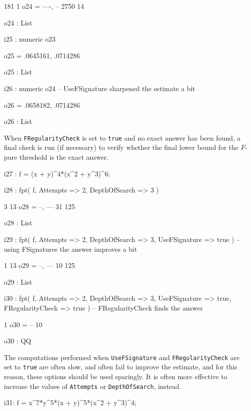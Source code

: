 \documentclass{amsart}
\begin{document}
{{\begin{MyVerbatim}
        181   1
o24 = {----, --}
       2750  14

o24 : List

i25 : numeric o23

o25 = {.0645161, .0714286}

o25 : List

i26 : numeric o24 -- UseFSignature sharpened the estimate a bit

o26 = {.0658182, .0714286}

o26 : List

\end{MyVerbatim}
}

When {\tt FRegularityCheck} is set to {\tt true} and no exact answer has been found, a final check is run (if necessary) to verify whether the final lower bound for the $F$-pure threshold is the exact answer.

{\small
{}
\begin{MyVerbatim}

i27 : f = (x + y)^4*(x^2 + y^3)^6;

i28 : fpt( f, Attempts => 2, DepthOfSearch => 3 )

        3   13
o28 = {--, ---}
       31  125

o28 : List

i29 : fpt( f, Attempts => 2, DepthOfSearch => 3, UseFSignature => true ) -- using FSignatures the answer improves a bit

        1   13
o29 = {--, ---}
       10  125

o29 : List

i30 : fpt( f, Attempts => 2, DepthOfSearch => 3, UseFSignature => true, FRegularityCheck => true ) -- FRegularityCheck finds the answer

       1
o30 = --
      10

o30 : QQ

\end{MyVerbatim}
}

The computations performed when {\tt UseFSignature} and {\tt FRegularityCheck} are set to {\tt true} are often slow, and often fail to improve the estimate, and for this reason, these options should be used sparingly.
            It is often more effective to increase the values of {\tt Attempts} or {\tt DepthOfSearch}, instead.
            
{\small
{}
\begin{MyVerbatim}
            
i31: f = x^7*y^5*(x + y)^5*(x^2 + y^3)^4;


\end{MyVerbatim}}}
\end{document}
